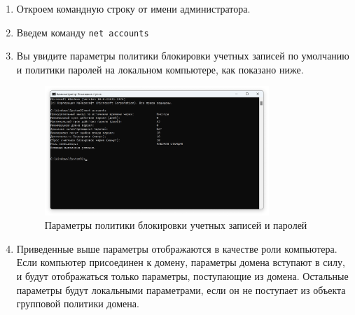 \documentclass[a4paper, 14pt]{report}
\begin{document}
\begin{enumerate}
    \item Откроем командную строку от имени администратора.
    \item Введем команду \texttt{net accounts}
    \item Вы увидите параметры политики блокировки учетных записей по умолчанию и политики паролей на локальном компьютере, как показано ниже.
          \begin{figure}[H]
              \centering
              \includegraphics[width=0.8\textwidth]{../images/net_accounts.png}
              \caption{Параметры политики блокировки учетных записей и паролей}
          \end{figure}
    \item Приведенные выше параметры отображаются в качестве роли компьютера. Если компьютер присоединен к домену, параметры домена вступают в силу, и будут отображаться только параметры, поступающие из домена. Остальные параметры будут локальными параметрами, если он не поступает из объекта групповой политики домена.


\end{enumerate}
\end{document}
